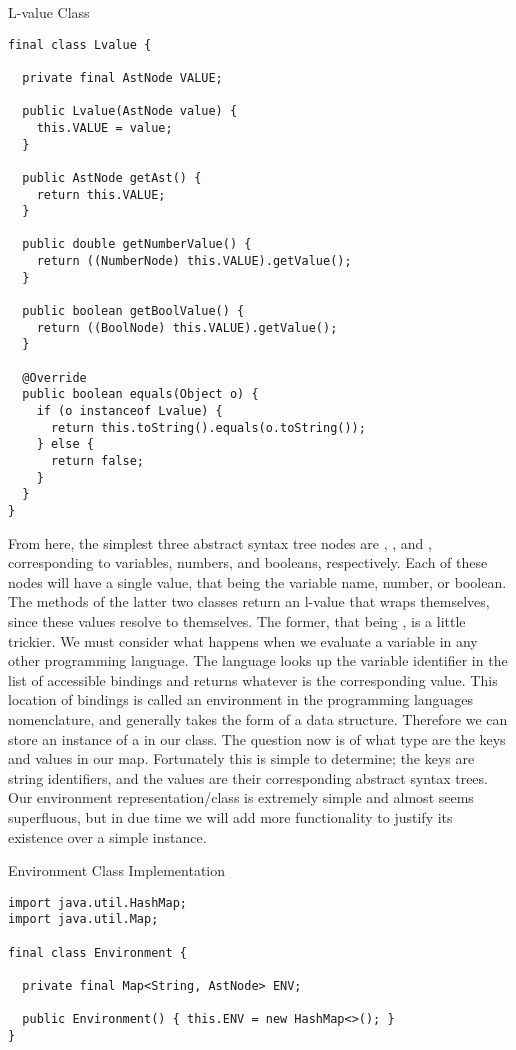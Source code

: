 \begin{cl}[]{L-value Class}
\begin{lstlisting}[language=MyJava]
final class Lvalue {

  private final AstNode VALUE;

  public Lvalue(AstNode value) { 
    this.VALUE = value; 
  }

  public AstNode getAst() { 
    return this.VALUE; 
  }

  public double getNumberValue() { 
    return ((NumberNode) this.VALUE).getValue(); 
  }

  public boolean getBoolValue() { 
    return ((BoolNode) this.VALUE).getValue(); 
  }

  @Override
  public boolean equals(Object o) {
    if (o instanceof Lvalue) { 
      return this.toString().equals(o.toString()); 
    } else { 
      return false; 
    }
  }
}
\end{lstlisting}
\end{cl}

From here, the simplest three abstract syntax tree nodes are , , and , corresponding to variables, numbers, and booleans, respectively. Each of these nodes will have a single value, that being the variable name, number, or boolean. The  methods of the latter two classes return an l-value that wraps themselves, since these values resolve to themselves. The former, that being , is a little trickier. We must consider what happens when we evaluate a variable in any other programming language. The language looks up the variable identifier in the list of accessible bindings and returns whatever is the corresponding value. This location of bindings is called an environment in the programming languages nomenclature, and generally takes the form of a  data structure. Therefore we can store an instance of a  in our  class. The question now is of what type are the keys and values in our map. Fortunately this is simple to determine; the keys are string identifiers, and the values are their corresponding abstract syntax trees. Our environment representation/class is extremely simple and almost seems superfluous, but in due time we will add more functionality to justify its existence over a simple  instance.

\begin{cl}[]{Environment Class Implementation}
\begin{lstlisting}[language=MyJava]
import java.util.HashMap;
import java.util.Map;

final class Environment {
  
  private final Map<String, AstNode> ENV;

  public Environment() { this.ENV = new HashMap<>(); }
}
\end{lstlisting}
\end{cl}

